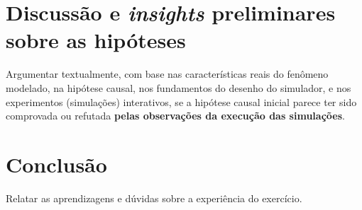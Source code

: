 






\section{Discussão e \textit{insights} preliminares sobre as hipóteses}

Argumentar textualmente, com base nas características reais do fenômeno modelado, na hipótese causal, nos fundamentos do desenho do simulador, e nos experimentos (simulações) interativos, se a hipótese causal inicial parece ter sido comprovada ou refutada \textbf{pelas observações da execução das simulações}.

\section{Conclusão}

Relatar as aprendizagens e dúvidas sobre a experiência do exercício.
